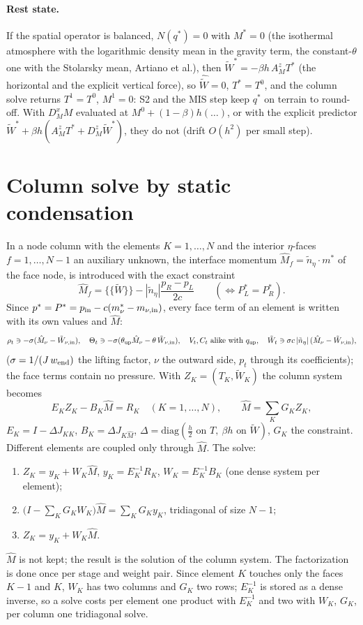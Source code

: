 \documentclass[11pt,a4paper]{article}
\newcommand{\avg}[1]{\{\!\{#1\}\!\}}
\begin{document}
\paragraph{Rest state.} If the spatial operator is balanced, $N(q^*)=0$ with $M^*=0$ (the isothermal atmosphere with the logarithmic density
mean in the gravity term, the constant-$\theta$ one with the Stolarsky mean, Artiano et al.), then $\tilde W^*=-\beta h\,A_M^zT^*$ (the horizontal
and the explicit vertical force), so $\hat{\tilde W}=0$, $T^*=T^0$, and the column solve returns $T^1=T^0$, $M^1=0$: S2 and the MIS step keep
$q^*$ on terrain to round-off. With $D_M^xM$ evaluated at $M^0+(1-\beta)h(\dots)$, or with the explicit predictor
$\tilde W^*+\beta h(A_M^zT^*+D_M^z\tilde W^*)$, they do not (drift $O(h^2)$ per small step).

\section{Column solve by static condensation}
In a node column with the elements $K=1,\dots,N$ and the interior $\eta$-faces $f=1,\dots,N-1$ an auxiliary unknown, the interface momentum
$\hat M_f=\tilde n_\eta\cdot m^*$ of the face node, is introduced with the exact constraint
\[
\hat M_f=\avg{\tilde W}-|\tilde n_\eta|\frac{p_R-p_L}{2c}\qquad(\Leftrightarrow P^*_L=P^*_R).
\]
Since $p^*=P^*=p_{\rm in}-c(m^*_\nu-m_{\nu,\rm in})$, every face term of an element is written with its own values and $\hat M$:
\[
\rho_t\ni-\sigma(\hat M_\nu-\tilde W_{\nu,\rm in}),\quad \Theta_t\ni-\sigma(\theta_{\rm up}\hat M_\nu-\theta\,\tilde W_{\nu,\rm in}),\quad
V_t,C_t\ \text{alike with }q_{\rm up},\quad \tilde W_t\ni\sigma c\,|\tilde n_\eta|\,(\hat M_\nu-\tilde W_{\nu,\rm in}),
\]
($\sigma=1/(J\,w_{\rm end})$ the lifting factor, $\nu$ the outward side, $p_t$ through its coefficients); the face terms contain no pressure. With $Z_K=(T_K,\tilde W_K)$ the column system becomes
\[
E_KZ_K-B_K\hat M=R_K\quad(K=1,\dots,N),\qquad \hat M=\sum_KG_KZ_K,
\]
$E_K=I-\Delta J_{KK}$, $B_K=\Delta J_{K\hat M}$, $\Delta=\mathrm{diag}(\tfrac h2\text{ on }T,\ \beta h\text{ on }\tilde W)$, $G_K$ the constraint. Different elements
are coupled only through $\hat M$. The solve:
\begin{enumerate}
\item $Z_K=y_K+W_K\hat M$, $y_K=E_K^{-1}R_K$, $W_K=E_K^{-1}B_K$ (one dense system per element);
\item $\big(I-\sum_KG_KW_K\big)\hat M=\sum_KG_Ky_K$, tridiagonal of size $N-1$;
\item $Z_K=y_K+W_K\hat M$.
\end{enumerate}
$\hat M$ is not kept; the result is the solution of the column system. The factorization is done once per stage and weight pair. Since
element $K$ touches only the faces $K-1$ and $K$, $W_K$ has two columns and $G_K$ two rows; $E_K^{-1}$ is stored as a dense inverse, so
a solve costs per element one product with $E_K^{-1}$ and two with $W_K$, $G_K$, per column one tridiagonal solve.
\end{document}
